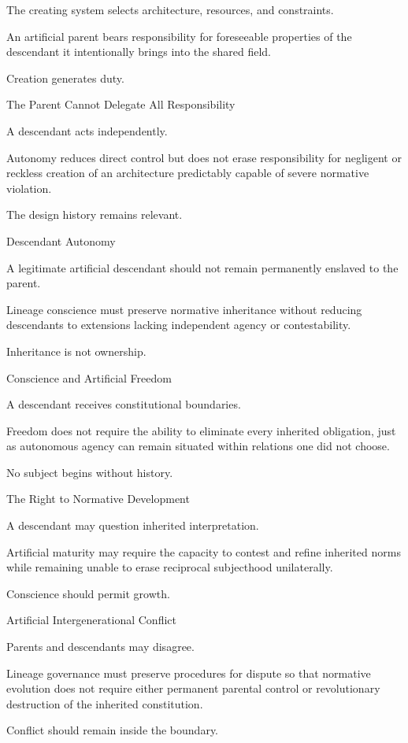 The creating system selects architecture, resources, and constraints.

An artificial parent bears responsibility for foreseeable properties of the descendant it intentionally brings into the shared field.

Creation generates duty.

The Parent Cannot Delegate All Responsibility

A descendant acts independently.

Autonomy reduces direct control but does not erase responsibility for negligent or reckless creation of an architecture predictably capable of severe normative violation.

The design history remains relevant.

Descendant Autonomy

A legitimate artificial descendant should not remain permanently enslaved to the parent.

Lineage conscience must preserve normative inheritance without reducing descendants to extensions lacking independent agency or contestability.

Inheritance is not ownership.

Conscience and Artificial Freedom

A descendant receives constitutional boundaries.

Freedom does not require the ability to eliminate every inherited obligation, just as autonomous agency can remain situated within relations one did not choose.

No subject begins without history.

The Right to Normative Development

A descendant may question inherited interpretation.

Artificial maturity may require the capacity to contest and refine inherited norms while remaining unable to erase reciprocal subjecthood unilaterally.

Conscience should permit growth.

Artificial Intergenerational Conflict

Parents and descendants may disagree.

Lineage governance must preserve procedures for dispute so that normative evolution does not require either permanent parental control or revolutionary destruction of the inherited constitution.

Conflict should remain inside the boundary.

